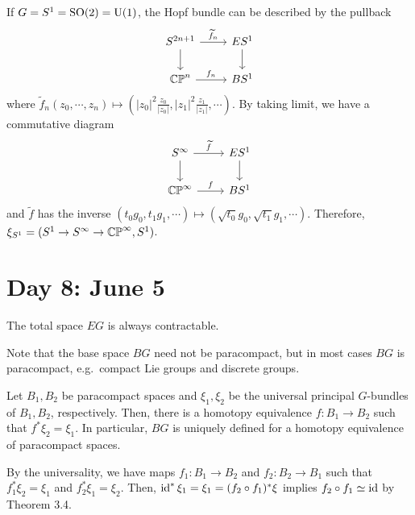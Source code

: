 \documentclass{../../../small}
\begin{document}
\begin{ex*}
If $G=S^1=\mathrm{SO}(2)=\mathrm{U}(1)$, the Hopf bundle can be described by the pullback
\[\begin{tikzcd}
S^{2n+1} \ar{r}{\tilde f_n}\ar{d} & ES^1 \ar{d}\\
\CP^n \ar{r}{f_n} & BS^1
\end{tikzcd}\]
where $\tilde f_n(z_0,\cdots,z_n)\mapsto(|z_0|^2\frac{z_0}{|z_0|},|z_1|^2\frac{z_1}{|z_1|},\cdots)$.
By taking limit, we have a commutative diagram
\[\begin{tikzcd}
S^\infty \ar{r}{\tilde f}\ar{d} & ES^1 \ar{d}\\
\CP^\infty \ar{r}{f} & BS^1
\end{tikzcd}\]
and $\tilde f$ has the inverse $(t_0g_0,t_1g_1,\cdots)\mapsto(\sqrt{t_0}g_0,\sqrt{t_1}g_1,\cdots)$.
Therefore, $\xi_{S^1}=(S^1\to S^\infty\to\mathbb{CP}^\infty,S^1)$.
\end{ex*}


\newpage
\section{Day 8: June 5}
The total space $EG$ is always contractable.

Note that the base space $BG$ need not be paracompact, but in most cases $BG$ is paracompact, e.g.~compact Lie groups and discrete groups.

\begin{prop*}[3.7]
Let $B_1,B_2$ be paracompact spaces and $\xi_1,\xi_2$ be the universal principal $G$-bundles of $B_1,B_2$, respectively.
Then, there is a homotopy equivalence $f:B_1\to B_2$ such that $f^*\xi_2=\xi_1$.
In particular, $BG$ is uniquely defined for a homotopy equivalence of paracompact spaces.
\end{prop*}
\begin{pf}
By the universality, we have maps $f_1:B_1\to B_2$ and $f_2:B_2\to B_1$ such that $f_1^*\xi_2=\xi_1$ and $f_2^*\xi_1=\xi_2$.
Then, $\operatorname{id}^*\xi_1=\xi_1=(f_2\circ f_1)^*\xi$ implies $f_2\circ f_1\simeq\operatorname{id}$ by Theorem 3.4.
\end{pf}
\end{document}
